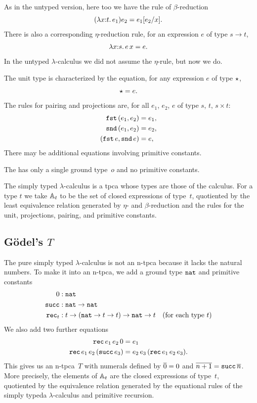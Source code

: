 As in the untyped version, here too we have the rule of
$\beta$-reduction
%
\begin{equation*}
  (\lam{x \of t}{e_1}) e_2 = \subst{e_1}{e_2/x}.
\end{equation*}
%
There is also a corresponding $\eta$-reduction rule, for an expression
$e$ of type $s \to t$,
%
\begin{equation*}
  \lam{x \of s}{e\,x} = e.
\end{equation*}
%
In the untyped $\lambda$-calculus we did not assume the $\eta$-rule,
but now we do.

The unit type is characterized by the equation, for any expression $e$
of type $\ttunit$,
%
\begin{equation*}
  \ttunit = e.
\end{equation*}
%
The rules for pairing and projections are, for all $e_1$, $e_2$, $e$
of type $s$, $t$, $s \times t$:
%
\begin{align*}
  \combFst\,(e_1, e_2) &= e_1,
  \\
  \combSnd\,(e_1, e_2) &= e_2,
  \\
  (\combFst\,e, \combSnd\,e) &= e,
\end{align*}
%
There may be additional equations involving primitive constants.

The  has only a single ground
type~$o$ and no primitive constants.

The simply typed $\lambda$-calculus is a tpca whose types are those of the
calculus. For a type $t$ we take $\AA_t$ to be the set of closed
expressions of type~$t$, quotiented by the least equivalence relation
generated by $\eta$- and $\beta$-reduction and the rules for the unit,
projections, pairing, and primitive constants.

\subsection[\texorpdfstring{Gödel's $T$}{Gödel's T}]{Gödel's $T$}

The pure simply typed $\lambda$-calculus is not an n-tpca because it lacks the
natural numbers. To make it into an n-tpca, we
add a ground type $\ttnat$ and primitive constants
%
\begin{align*}
  0 &: \ttnat \\
  \combSucc  &: \ttnat \to \ttnat \\
  \combRec_t &: t \to (\mathtt{nat} \to t \to t) \to \ttnat \to t
  \quad\text{(for each type $t$)}
\end{align*}
%
We also add two further equations
%
\begin{align*}
  \combRec \, e_1 \, e_2 \, 0 &= e_1
  \\
  \combRec \, e_1 \, e_2 \, (\combSucc \, e_3) &=
  e_2 \, e_3 \, (\combRec \, e_1 \, e_2 \, e_3).
\end{align*}
%
This gives us an n-tpca~$T$ with numerals defined by $\numeral{0} = 0$
and $\numeral{n+1} = \combSucc \, \numeral{n}$. More precisely, the
elements of $\AA_t$ are the closed expressions of type~$t$, quotiented by
the equivalence relation generated by the equational rules of the simply typeda
$\lambda$-calculus and primitive recursion.

